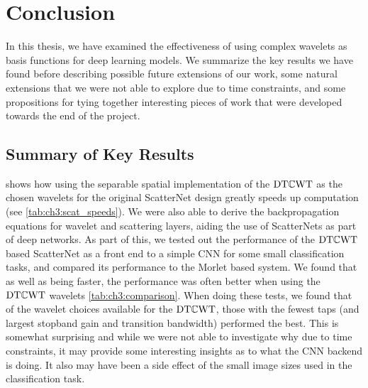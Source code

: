 \chapter{Conclusion}\label{ch:conclusion}
\def \path {intro/}
\def \imgpath {intro/images}

In this thesis, we have examined the effectiveness of using complex wavelets as
basis functions for deep learning models. We summarize the key results we have
found before describing possible future extensions of our work, some natural
extensions that we were not able to explore due to time constraints, and some
propositions for tying together interesting pieces of work that were developed 
towards the end of the project.


\section{Summary of Key Results}
\textbf{} shows how using the separable spatial implementation of 
the $\mathrm{DT}\mathbb{C}\mathrm{WT}$ as the chosen wavelets for the original ScatterNet design greatly
speeds up computation (see \autoref{tab:ch3:scat_speeds}). We were also able to
derive the backpropagation equations for wavelet and scattering layers, aiding
the use of ScatterNets as part of deep networks. As part of this, we tested out
the performance of the $\mathrm{DT}\mathbb{C}\mathrm{WT}$ based ScatterNet as a front end to a simple CNN for 
some small classification tasks, and compared its performance to the Morlet based system. We
found that as well as being faster, the performance was often better when using
the $\mathrm{DT}\mathbb{C}\mathrm{WT}$ wavelets \autoref{tab:ch3:comparison}. When doing these tests, we
found that of the wavelet choices available for the $\mathrm{DT}\mathbb{C}\mathrm{WT}$, those with the
fewest taps (and largest stopband gain and transition bandwidth) performed the best. This is
somewhat surprising and while we were not able to investigate why due to time
constraints, it may provide some interesting insights as to what the CNN backend 
is doing. It also may have been a side effect of the small image sizes used in the
classification task.

